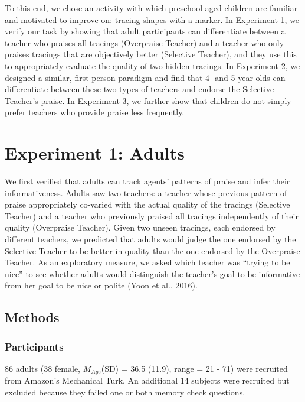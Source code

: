 \documentclass[10pt, letterpaper]{article}
\begin{document}
To this end, we chose an activity with which preschool-aged children are
familiar and motivated to improve on: tracing shapes with a marker. In
Experiment 1, we verify our task by showing that adult participants can
differentiate between a teacher who praises all tracings (Overpraise
Teacher) and a teacher who only praises tracings that are objectively
better (Selective Teacher), and they use this to appropriately evaluate
the quality of two hidden tracings. In Experiment 2, we designed a
similar, first-person paradigm and find that 4- and 5-year-olds can
differentiate between these two types of teachers and endorse the
Selective Teacher's praise. In Experiment 3, we further show that
children do not simply prefer teachers who provide praise less
frequently.

\section{Experiment 1: Adults}\label{experiment-1-adults}

We first verified that adults can track agents' patterns of praise and
infer their informativeness. Adults saw two teachers: a teacher whose
previous pattern of praise appropriately co-varied with the actual
quality of the tracings (Selective Teacher) and a teacher who previously
praised all tracings independently of their quality (Overpraise
Teacher). Given two unseen tracings, each endorsed by different
teachers, we predicted that adults would judge the one endorsed by the
Selective Teacher to be better in quality than the one endorsed by the
Overpraise Teacher. As an exploratory measure, we asked which teacher
was ``trying to be nice'' to see whether adults would distinguish the
teacher's goal to be informative from her goal to be nice or polite
(Yoon et al., 2016).

\subsection{Methods}\label{methods}

\subsubsection{Participants}\label{participants}

86 adults (38 female, \(M_{Age}\)(SD) = 36.5 (11.9), range = 21 - 71)
were recruited from Amazon's Mechanical Turk. An additional 14 subjects
were recruited but excluded because they failed one or both memory check
questions.
\end{document}
